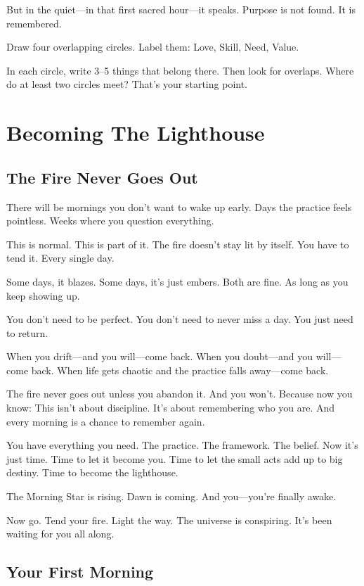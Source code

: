 \documentclass[11pt, a5paper, openright]{book}
\begin{document}
But in the quiet—in that first sacred hour—it speaks. Purpose is not found. It is remembered.

\begin{reflectionbox}
Draw four overlapping circles. Label them: Love, Skill, Need, Value.

In each circle, write 3–5 things that belong there. Then look for overlaps. Where do at least two circles meet? That's your starting point.
\end{reflectionbox}

\part{Becoming The Lighthouse}

\chapter{The Fire Never Goes Out}

There will be mornings you don't want to wake up early. Days the practice feels pointless. Weeks where you question everything.

This is normal. This is part of it. The fire doesn't stay lit by itself. You have to tend it. Every single day.

Some days, it blazes. Some days, it's just embers. Both are fine. As long as you keep showing up.

You don't need to be perfect. You don't need to never miss a day. You just need to return.

When you drift—and you will—come back.
When you doubt—and you will—come back.
When life gets chaotic and the practice falls away—come back.

The fire never goes out unless you abandon it. And you won't. Because now you know: This isn't about discipline. It's about remembering who you are. And every morning is a chance to remember again.

You have everything you need. The practice. The framework. The belief. Now it's just time. Time to let it become you. Time to let the small acts add up to big destiny. Time to become the lighthouse.

The Morning Star is rising. Dawn is coming. And you—you're finally awake.

Now go. Tend your fire. Light the way. The universe is conspiring. It's been waiting for you all along.

\chapter*{Your First Morning}
\end{document}
